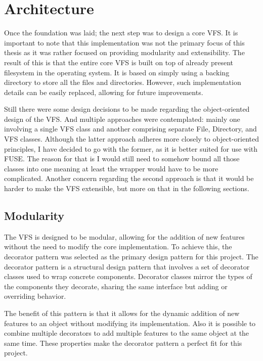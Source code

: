 \section{Architecture}\label{sec:architecture}

Once the foundation was laid; the next step was to design a core VFS\@.
It is important to note that this implementation was not the primary focus of this thesis as it was rather focused on providing modularity and extensibility.
The result of this is that the entire core VFS is built on top of already present filesystem in the operating system.
It is based on simply using a backing directory to store all the files and directories.
However, such implementation details can be easily replaced, allowing for future improvements.

Still there were some design decisions to be made regarding the object-oriented design of the VFS\@.
And multiple approaches were contemplated: mainly one involving a single VFS class and another comprising separate File, Directory, and VFS classes.
Although the latter approach adheres more closely to object-oriented principles, I have decided to go with the former, as it is better suited for use with FUSE\@.
The reason for that is I would still need to somehow bound all those classes into one meaning at least the wrapper would have to be more complicated.
Another concern regarding the second approach is that it would be harder to make the VFS extensible, but more on that in the following sections.

\subsection{Modularity}\label{subsec:modularity}

The VFS is designed to be modular, allowing for the addition of new features without the need to modify the core implementation.
To achieve this, the decorator pattern was selected as the primary design pattern for this project.
The decorator pattern is a structural design pattern that involves a set of decorator classes used to wrap concrete components.
Decorator classes mirror the types of the components they decorate, sharing the same interface but adding or overriding behavior.

The benefit of this pattern is that it allows for the dynamic addition of new features to an object without modifying its implementation.
Also it is possible to combine multiple decorators to add multiple features to the same object at the same time.
These properties make the decorator pattern a perfect fit for this project.

